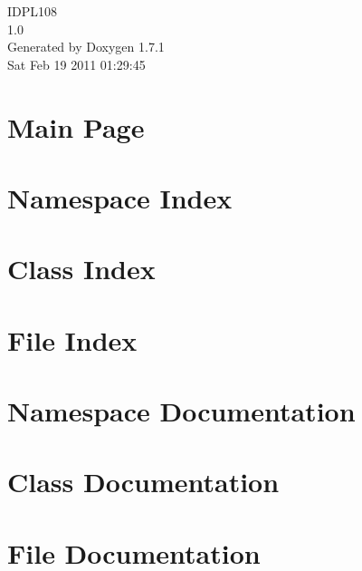 \documentclass[a4paper]{book}
\begin{document}
\hypersetup{pageanchor=false}
\begin{titlepage}
\vspace*{7cm}
\begin{center}
{\Large IDPL108 \\[1ex]\large 1.0 }\\
\vspace*{1cm}
{\large Generated by Doxygen 1.7.1}\\
\vspace*{0.5cm}
{\small Sat Feb 19 2011 01:29:45}\\
\end{center}
\end{titlepage}
\clearemptydoublepage
{}
\tableofcontents
\clearemptydoublepage
{}
\hypersetup{pageanchor=true}
\chapter{Main Page}
\label{index}\hypertarget{index}{}
\chapter{Namespace Index}

\chapter{Class Index}

\chapter{File Index}

\chapter{Namespace Documentation}

\chapter{Class Documentation}









\chapter{File Documentation}



















\printindex
\end{document}
